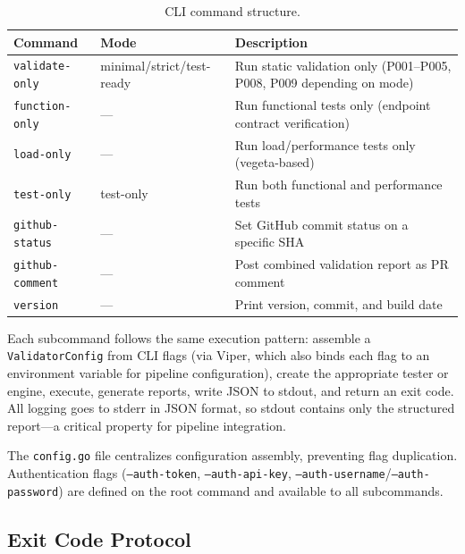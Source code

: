 \begin{table}[htbp]
\centering
\caption{CLI command structure.}
\label{tab:cli-commands}
\small
\begin{tabular}{@{}llp{5cm}@{}}
\toprule
\textbf{Command} & \textbf{Mode} & \textbf{Description} \\
\midrule
\texttt{validate-only}  & minimal/strict/test-ready & Run static validation only (P001--P005, P008, P009 depending on mode) \\
\texttt{function-only}   & --- & Run functional tests only (endpoint contract verification) \\
\texttt{load-only}       & --- & Run load/performance tests only (vegeta-based) \\
\texttt{test-only}       & test-only & Run both functional and performance tests \\
\texttt{github-status}   & --- & Set GitHub commit status on a specific SHA \\
\texttt{github-comment}  & --- & Post combined validation report as PR comment \\
\texttt{version}         & --- & Print version, commit, and build date \\
\bottomrule
\end{tabular}
\end{table}

Each subcommand follows the same execution pattern: assemble a \texttt{ValidatorConfig} from CLI flags (via Viper, which also binds each flag to an environment variable for pipeline configuration), create the appropriate tester or engine, execute, generate reports, write JSON to stdout, and return an exit code. All logging goes to stderr in JSON format, so stdout contains only the structured report---a critical property for pipeline integration.

The \texttt{config.go} file centralizes configuration assembly, preventing flag duplication. Authentication flags (\texttt{--auth-token}, \texttt{--auth-api-key}, \texttt{--auth-username}/\texttt{--auth-password}) are defined on the root command and available to all subcommands.

\subsection{Exit Code Protocol}
\label{subsec:exit-codes}

